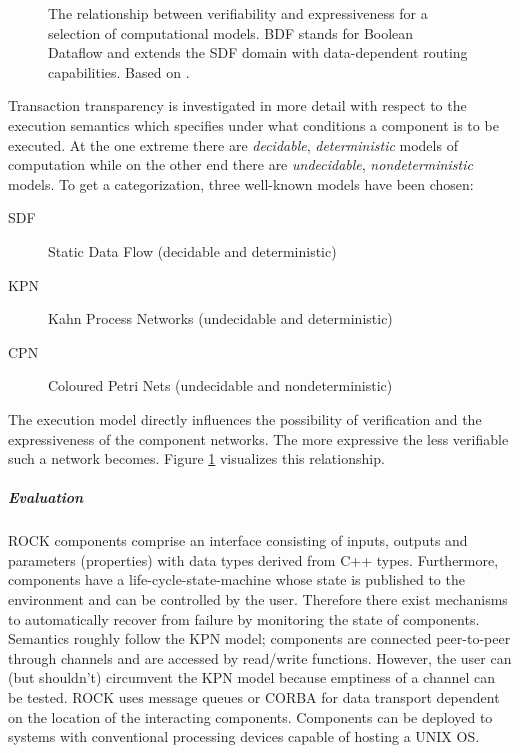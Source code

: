 \documentclass[a4paper,twocolumn]{esapub2005} %
\begin{document}
\begin{figure}
    \centering
    \caption{
        The relationship between verifiability and expressiveness for a selection of computational models.
        BDF stands for Boolean Dataflow and extends the SDF domain with data-dependent routing capabilities.
        Based on \cite{Basten}.
    }
    \label{fig:verifiability}
\end{figure}
Transaction transparency is investigated in more detail with respect to the execution semantics which specifies under what conditions a component is to be executed.
At the one extreme there are \emph{decidable}, \emph{deterministic} models of computation
while on the other end there are \emph{undecidable}, \emph{nondeterministic} models.
To get a categorization, three well-known models have been chosen:
\begin{description}
    \item[SDF] Static Data Flow (decidable and deterministic)
    \item[KPN] Kahn Process Networks (undecidable and deterministic)
    \item[CPN] Coloured Petri Nets (undecidable and nondeterministic)
\end{description}
The execution model directly influences the possibility of verification and the expressiveness of the component networks.
The more expressive the less verifiable such a network becomes.
Figure \ref{fig:verifiability} visualizes this relationship.

\subparagraph{Evaluation}
ROCK components comprise an interface consisting of inputs, outputs and parameters (properties) with data types derived from C++ types.
Furthermore, components have a life-cycle-state-machine whose state is published to the environment and can be controlled by the user.
Therefore there exist mechanisms to automatically recover from failure by monitoring the state of components. %
Semantics roughly follow the KPN model; components are connected peer-to-peer through channels and are accessed by read/write functions. %
However, the user can (but shouldn't) circumvent the KPN model because emptiness of a channel can be tested.
ROCK uses message queues or CORBA for data transport dependent on the location of the interacting components. %
Components can be deployed to systems with conventional processing devices capable of hosting a UNIX OS. %
\end{document}
